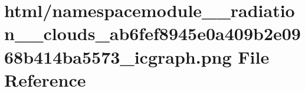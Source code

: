 \hypertarget{namespacemodule____radiation____clouds__ab6fef8945e0a409b2e0968b414ba5573__icgraph_8png}{}\section{html/namespacemodule\+\_\+\+\_\+radiation\+\_\+\+\_\+clouds\+\_\+ab6fef8945e0a409b2e0968b414ba5573\+\_\+icgraph.png File Reference}
\label{namespacemodule____radiation____clouds__ab6fef8945e0a409b2e0968b414ba5573__icgraph_8png}
